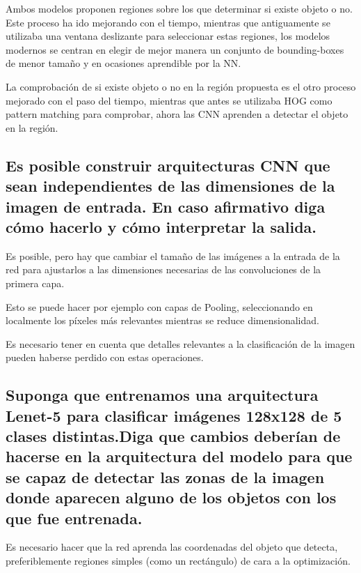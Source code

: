 \documentclass[11pt]{scrartcl} %
\begin{document}

Ambos modelos proponen regiones sobre los que determinar si existe objeto
o no. Este proceso ha ido mejorando con el tiempo, mientras que antiguamente se
utilizaba una ventana deslizante para seleccionar estas regiones, los modelos
modernos se centran en elegir de mejor manera un conjunto de bounding-boxes de 
menor tamaño y en ocasiones aprendible por la NN. \newline

La comprobación de si existe objeto o no en la región propuesta es el otro 
proceso mejorado con el paso del tiempo, mientras que antes se utilizaba HOG
como pattern matching para comprobar, ahora las CNN aprenden a detectar el objeto en
la región.

\subsection{Es posible construir arquitecturas CNN que sean independientes
de las dimensiones de la imagen de entrada. En caso afirmativo diga
cómo hacerlo y cómo interpretar la salida.}


Es posible, pero hay que cambiar el tamaño de las imágenes
a la entrada de la red para ajustarlos a las dimensiones necesarias de las 
convoluciones de la primera capa. \newline

Esto se puede hacer por ejemplo con capas de Pooling, seleccionando en localmente
los píxeles más relevantes mientras se reduce dimensionalidad. \newline

Es necesario tener en cuenta que detalles relevantes a la clasificación de la
imagen pueden haberse perdido con estas operaciones.

\subsection{Suponga que entrenamos una arquitectura Lenet-5 para clasificar
imágenes 128x128 de 5 clases distintas.\newline Diga que cambios deberían de
hacerse en la arquitectura del modelo para que se capaz de detectar
las zonas de la imagen donde aparecen alguno de los objetos con los
que fue entrenada.}


Es necesario hacer que la red aprenda las coordenadas del objeto que detecta,
preferiblemente regiones simples (como un rectángulo) de cara a la optimización. \newline
\end{document}
